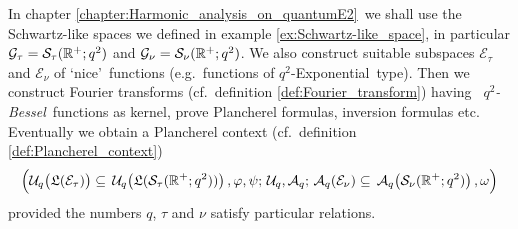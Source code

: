 In chapter \ref{chapter:Harmonic_analysis_on_quantumE2}\ we shall use the
Schwartz-like spaces we defined in example \ref{ex:Schwartz-like_space}, in particular
\mbox{$\mathcal G_\tau = {\mathcal S}_\tau(\mathbb{R}^+;q^2)$} and $\mathcal G_\nu = {\mathcal S}_\nu(\mathbb{R}^+;q^2)$.
We also construct suitable subspaces ${\mathcal E}_\tau$ and ${\mathcal E}_\nu$
of \lq nice\rq\ functions (e.g.\ functions of \mbox{$q^2$-Exponential}\ type).
Then we construct Fourier transforms (cf.\ definition \ref{def:Fourier_transform})
having {\em \little\ \mbox{$q^2$-Bessel}}\ functions as kernel, prove Plancherel formulas,
inversion formulas etc. Eventually we obtain a Plancherel context
(cf.\ definition \ref{def:Plancherel_context})
$$ \left( \Uq\!\left(\calL({\mathcal E}_\tau)\vertM\right)  \subseteq\,
          \Uq\!\left(\calL({\mathcal S}_\tau(\RR^+;q^2)) \vertM \right),
          \varphi, \psi; \, \Uq, \Aq; \,
          \Aq({\mathcal E}_\nu)  \subseteq \,
          \Aq\!\left({\mathcal S}_\nu(\RR^+;q^2)\vertM \right),
          \omega \vertL \right)$$
provided the numbers $q$, $\tau$ and $\nu$ satisfy particular relations.
